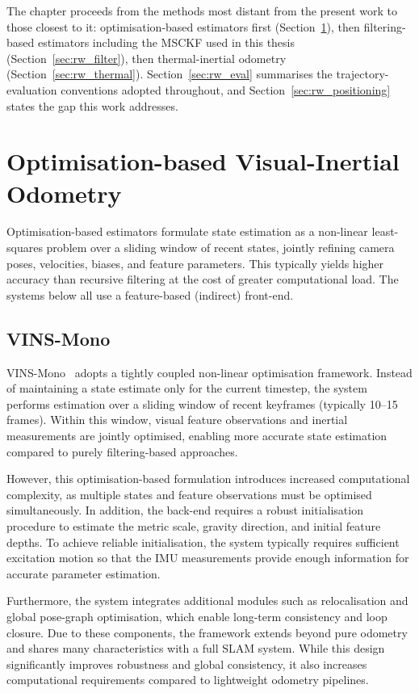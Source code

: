 The chapter proceeds from the methods most distant from the present work to those closest to it: optimisation-based estimators first (Section~\ref{sec:rw_optim}), then filtering-based estimators including the MSCKF used in this thesis (Section~\ref{sec:rw_filter}), then thermal-inertial odometry (Section~\ref{sec:rw_thermal}). Section~\ref{sec:rw_eval} summarises the trajectory-evaluation conventions adopted throughout, and Section~\ref{sec:rw_positioning} states the gap this work addresses.

\section{Optimisation-based Visual-Inertial Odometry}
\label{sec:rw_optim}

Optimisation-based estimators formulate state estimation as a non-linear least-squares problem over a sliding window of recent states, jointly refining camera poses, velocities, biases, and feature parameters. This typically yields higher accuracy than recursive filtering at the cost of greater computational load. The systems below all use a feature-based (indirect) front-end.

\subsection{VINS-Mono}
VINS-Mono~\cite{Qin_2018} adopts a tightly coupled non-linear optimisation framework. Instead of maintaining a state estimate only for the current timestep, the system performs estimation over a sliding window of recent keyframes (typically 10--15 frames). Within this window, visual feature observations and inertial measurements are jointly optimised, enabling more accurate state estimation compared to purely filtering-based approaches.

However, this optimisation-based formulation introduces increased computational complexity, as multiple states and feature observations must be optimised simultaneously. In addition, the back-end requires a robust initialisation procedure to estimate the metric scale, gravity direction, and initial feature depths. To achieve reliable initialisation, the system typically requires sufficient excitation motion so that the IMU measurements provide enough information for accurate parameter estimation.

Furthermore, the system integrates additional modules such as relocalisation and global pose-graph optimisation, which enable long-term consistency and loop closure. Due to these components, the framework extends beyond pure odometry and shares many characteristics with a full SLAM system. While this design significantly improves robustness and global consistency, it also increases computational requirements compared to lightweight odometry pipelines.

